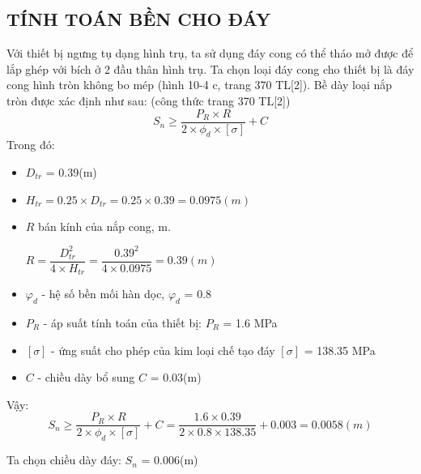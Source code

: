 \subsection{TÍNH TOÁN BỀN CHO ĐÁY}
Với thiết bị ngưng tụ dạng hình trụ, ta sử dụng đáy cong có thể tháo mở được để lắp ghép với bích ở 2 đầu thân hình trụ. Ta chọn loại đáy cong cho thiết bị là đáy cong hình tròn không bo mép (hình 10-4 c, trang 370 TL[2]).
Bề dày loại nắp tròn được xác định như sau: (công thức trang 370 TL[2])
\begin{equation*}
	S_{n} \geq \dfrac{P_{R}\times R}{2\times \phi_{d}\times[\sigma]} + C
\end{equation*}
Trong đó:
\begin{itemize}
	\item $D_{tr}$ = 0.39(m)
	\item $H_{tr} = 0.25\times D_{tr} = 0.25 \times 0.39 = 0.0975(m)$
	\item $R$ bán kính của nắp cong, m.
	
	$R = \dfrac{D_{tr}^2}{4\times H_{tr}} = \dfrac{0.39^2}{4 \times 0.0975} = 0.39(m)$
	\item $ \varphi_{d} $ - hệ số bền mối hàn dọc, $\varphi_{d}$ = 0.8
	\item $P_{R}$ - áp suất tính toán của thiết bị: $P_{R}$ = 1.6 MPa
	\item $[\sigma]$ - ứng suất cho phép của kim loại chế tạo đáy $[\sigma]$ = 138.35 MPa 
	\item $C$ - chiều dày bổ sung $C$ = 0.03(m)
\end{itemize}

Vậy: 
\begin{equation*}
	S_{n} \geq \dfrac{P_{R}\times R}{2\times \phi_{d}\times[\sigma]} + C = \dfrac{1.6 \times 0.39}{2 \times 0.8 \times 138.35}+0.003 = 0.0058(m)
\end{equation*}

Ta chọn chiều dày đáy: $S_{n}$ = 0.006(m)

